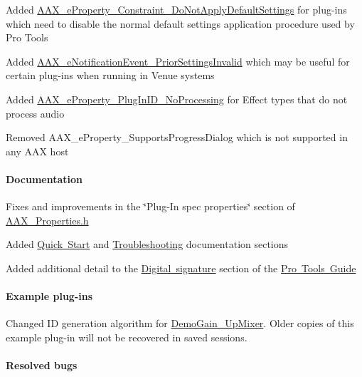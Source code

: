 \begin{DoxyItemize}
\item Added \mbox{\hyperlink{a00662_a13e384f22825afd3db6d68395b79ce0da80bb55dbba6cba01120eda8f86284eba}{A\+A\+X\+\_\+e\+Property\+\_\+\+Constraint\+\_\+\+Do\+Not\+Apply\+Default\+Settings}} for plug-\/ins which need to disable the normal default settings application procedure used by Pro Tools  
\item Added \mbox{\hyperlink{a00491_afab5ea2cfd731fc8f163b6caa685406ea40644990a3de0fec1f25929b535f7760}{A\+A\+X\+\_\+e\+Notification\+Event\+\_\+\+Prior\+Settings\+Invalid}} which may be useful for certain plug-\/ins when running in Venue systems  
\item Added \mbox{\hyperlink{a00662_a13e384f22825afd3db6d68395b79ce0da699fa67ab37a566fbcb8fe08d6a3cf8b}{A\+A\+X\+\_\+e\+Property\+\_\+\+Plug\+In\+I\+D\+\_\+\+No\+Processing}} for Effect types that do not process audio  
\item Removed {\ttfamily A\+A\+X\+\_\+e\+Property\+\_\+\+Supports\+Progress\+Dialog} which is not supported in any A\+AX host  
\end{DoxyItemize}\hypertarget{a00847_aax_sdk_2p3p2_Documentation}{}\paragraph{Documentation}\label{a00847_aax_sdk_2p3p2_Documentation}

\begin{DoxyItemize}
\item Fixes and improvements in the \char`\"{}\+Plug-\/\+In spec properties\char`\"{} section of \mbox{\hyperlink{a00662}{A\+A\+X\+\_\+\+Properties.\+h}}  
\item Added \mbox{\hyperlink{a00794_aax_sdk_guide_quickstart}{Quick Start}} and \mbox{\hyperlink{a00842}{Troubleshooting}} documentation sections  
\item Added additional detail to the \mbox{\hyperlink{a00830_subsection__digital_signature_}{Digital signature}} section of the \mbox{\hyperlink{a00830}{Pro Tools Guide}}  
\end{DoxyItemize}\hypertarget{a00847_aax_sdk_2p3p2_ExamplePlugIns}{}\paragraph{Example plug-\/ins}\label{a00847_aax_sdk_2p3p2_ExamplePlugIns}

\begin{DoxyItemize}
\item Changed ID generation algorithm for \mbox{\hyperlink{a00848_DemoGain_UpMixer}{Demo\+Gain\+\_\+\+Up\+Mixer}}. Older copies of this example plug-\/in will not be recovered in saved sessions.  
\end{DoxyItemize}\hypertarget{a00847_aax_sdk_2p3p2_ResolvedBugs}{}\paragraph{Resolved bugs}\label{a00847_aax_sdk_2p3p2_ResolvedBugs}

